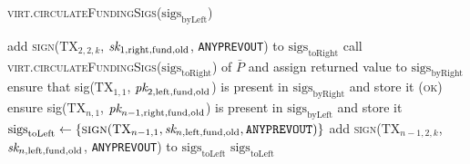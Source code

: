 \begin{center}
\begin{processbox}{\textsc{virt.circulateFundingSigs}($\mathrm{sigs}_{\mathrm{byLeft}}$)}
\begin{algorithmic}[1]
          \State add \textsc{sign}($\mathrm{TX}_{2, 2, k}$, $\textit{sk}_{1,
          \mathrm{right}, \mathrm{fund}, \mathrm{old}}$, \texttt{ANYPREVOUT})
          to $\mathrm{sigs}_{\mathrm{toRight}}$
        \EndFor
        \label{code:virtual-layer:funding-sigs:funder-sign-second-end}
        \State call
        \textsc{virt.circulateFundingSigs}($\mathrm{sigs}_{\mathrm{toRight}}$)
        of $\bar{P}$ and assign returned value to
        $\mathrm{sigs}_{\mathrm{byRight}}$
        \State ensure that sig($\mathrm{TX}_{1, 1}$, $\textit{pk}_{2, \mathrm{left},
        \mathrm{fund}, \mathrm{old}}$) is present in
        $\mathrm{sigs}_{\mathrm{byRight}}$ and store it
        \label{code:virtual-layer:funding-sigs:funder-check-sig}
        \State \Return (\textsc{ok})
       
        \State ensure sig($\mathrm{TX}_{n, 1}$, $\textit{pk}_{n-1, \mathrm{right},
        \mathrm{fund}, \mathrm{old}}$) is present in
        $\mathrm{sigs}_{\mathrm{byLeft}}$ and store it
        \State $\mathrm{sigs}_{\mathrm{toLeft}} \gets
        \{\textsc{sign}(\mathrm{TX}_{n-1, 1}, \textit{sk}_{n, \mathrm{left},
        \mathrm{fund}, \mathrm{old}}, \texttt{ANYPREVOUT})\}$
          \State add \textsc{sign}($\mathrm{TX}_{n-1, 2, k}$, $\textit{sk}_{n,
          \mathrm{left}, \mathrm{fund}, \mathrm{old}}$, \texttt{ANYPREVOUT}) to
          $\mathrm{sigs}_{\mathrm{toLeft}}$
        \EndFor
        \State \Return $\mathrm{sigs}_{\mathrm{toLeft}}$
      \EndIf \: 
    \end{algorithmic}
  \end{processbox}
  \label{code:virtual-layer:funding-sigs}
\end{center} \ \\

